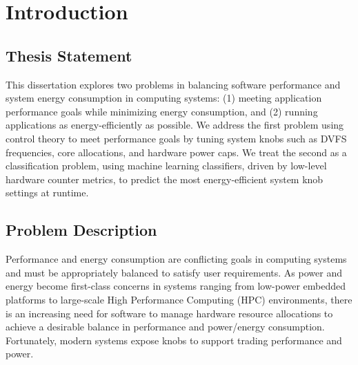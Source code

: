\chapter{Introduction}
\label{sec:intro}

\section{Thesis Statement}

This dissertation explores two problems in balancing software performance and system energy consumption in computing systems: (1) meeting application performance goals while minimizing energy consumption, and (2) running applications as energy-efficiently as possible.
We address the first problem using control theory to meet performance goals by tuning system knobs such as DVFS frequencies, core allocations, and hardware power caps.
We treat the second as a classification problem, using machine learning classifiers, driven by low-level hardware counter metrics, to predict the most energy-efficient system knob settings at runtime.


\section{Problem Description}
\label{sec:intro-description}

Performance and energy consumption are conflicting goals in computing systems and must be appropriately balanced to satisfy user requirements.
As power and energy become first-class concerns in systems ranging from low-power embedded platforms to large-scale High Performance Computing (HPC) environments, there is an increasing need for software to manage hardware resource allocations to achieve a desirable balance in performance and power/energy consumption.
Fortunately, modern systems expose knobs to support trading performance and power.

